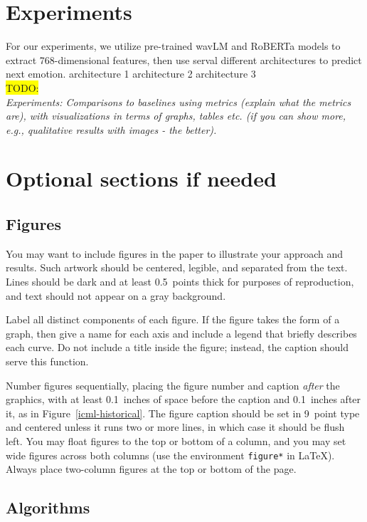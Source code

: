 \documentclass{article}
\begin{document}
\section{Experiments}
For our experiments, we utilize pre-trained wavLM and RoBERTa
models to extract 768-dimensional features, then use serval different architectures to predict next emotion.
architecture 1
architecture 2
architecture 3
\\ \colorbox{yellow}{TODO:}\\
\textit{Experiments: Comparisons to baselines using metrics (explain what the metrics are), with visualizations in terms of graphs, tables etc. (if you can show more, e.g., qualitative results with images - the better).}\\

\section{Optional sections if needed}

\subsection{Figures}

You may want to include figures in the paper to illustrate
your approach and results. Such artwork should be centered,
legible, and separated from the text. Lines should be dark and at
least 0.5~points thick for purposes of reproduction, and text should
not appear on a gray background.

Label all distinct components of each figure. If the figure takes the
form of a graph, then give a name for each axis and include a legend
that briefly describes each curve. Do not include a title inside the
figure; instead, the caption should serve this function.

Number figures sequentially, placing the figure number and caption
\emph{after} the graphics, with at least 0.1~inches of space before
the caption and 0.1~inches after it, as in
Figure~\ref{icml-historical}. The figure caption should be set in
9~point type and centered unless it runs two or more lines, in which
case it should be flush left. You may float figures to the top or
bottom of a column, and you may set wide figures across both columns
(use the environment \texttt{figure*} in \LaTeX). Always place
two-column figures at the top or bottom of the page.

\subsection{Algorithms}
\end{document}

